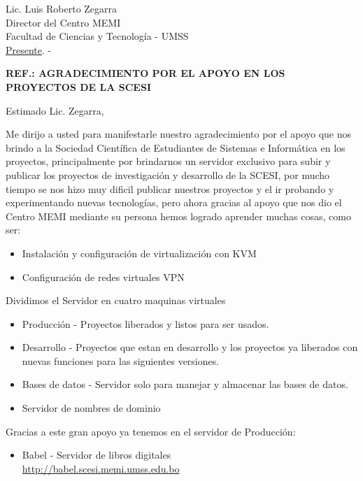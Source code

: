 \documentclass[letterpaper,12pt]{letter}
\begin{document}
\date {12 de julio de 2012}

\begin{letter}{Lic. Luis Roberto Zegarra \\ Director del Centro MEMI \\ Facultad de Ciencias y Tecnolog\'ia - UMSS \\ \underline {Presente}. -}

\begin{center}
	\opening{\textbf{REF.: AGRADECIMIENTO POR EL APOYO EN LOS PROYECTOS DE LA SCESI}}
\end{center}

Estimado Lic. Zegarra,

Me dirijo a usted para manifestarle nuestro agradecimiento por el apoyo que nos brindo a la Sociedad
Cient\'ifica de Estudiantes de Sistemas e Inform\'atica en los proyectos, principalmente por
brindarnos un servidor exclusivo para subir y publicar los proyectos de investigaci\'on y desarrollo 
de la SCESI, por mucho tiempo se nos hizo muy dificil publicar nuestros proyectos y el ir probando y
experimentando nuevas tecnolog\'ias, pero ahora gracias al apoyo que nos dio el Centro MEMI mediante
su persona hemos logrado aprender muchas cosas, como ser:

\begin{itemize}
    \item Instalaci\'on y configuraci\'on de virtualizaci\'on con KVM
    \item Configuraci\'on de redes virtuales VPN
\end{itemize}

Dividimos el Servidor en cuatro maquinas virtuales

\begin{itemize}
    \item Producci\'on - Proyectos liberados y listos para ser usados.
    \item Desarrollo - Proyectos que estan en desarrollo y los proyectos ya liberados con nuevas 
    funciones para las siguientes versiones.
    \item Bases de datos - Servidor solo para manejar y almacenar las bases de datos.
    \item Servidor de nombres de dominio
\end{itemize}

Gracias a este gran apoyo ya tenemos en el servidor de Producci\'on:

\begin{itemize}
    \item Babel - Servidor de libros digitales\\
    \url{http://babel.scesi.memi.umss.edu.bo}
\end{itemize}


\end{letter}
\end{document}

